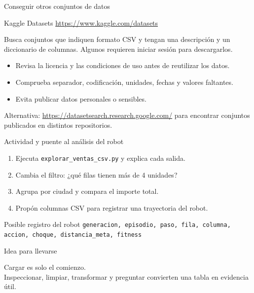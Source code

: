 \documentclass[aspectratio=169,11pt]{beamer}
\begin{document}
\begin{frame}{Conseguir otros conjuntos de datos}
  \begin{block}{Kaggle Datasets}
    \url{https://www.kaggle.com/datasets}
  \end{block}
  Busca conjuntos que indiquen formato CSV y tengan una descripción y un diccionario de columnas. Algunos requieren iniciar sesión para descargarlos.
  \begin{itemize}
    \item Revisa la licencia y las condiciones de uso antes de reutilizar los datos.
    \item Comprueba separador, codificación, unidades, fechas y valores faltantes.
    \item Evita publicar datos personales o sensibles.
  \end{itemize}
  \vspace{0.15cm}
  \small Alternativa: \url{https://datasetsearch.research.google.com/} para encontrar conjuntos publicados en distintos repositorios.
\end{frame}

\begin{frame}{Actividad y puente al análisis del robot}
  \begin{enumerate}
    \item Ejecuta \texttt{explorar\_ventas\_csv.py} y explica cada salida.
    \item Cambia el filtro: ¿qué filas tienen más de 4 unidades?
    \item Agrupa por ciudad y compara el importe total.
    \item Propón columnas CSV para registrar una trayectoria del robot.
  \end{enumerate}
  \begin{block}{Posible registro del robot}
    \texttt{generacion, episodio, paso, fila, columna, accion, choque, distancia\_meta, fitness}
  \end{block}
\end{frame}

\begin{frame}{Idea para llevarse}
  \begin{center}
    \Large Cargar es solo el comienzo.\\[0.3cm]
    \normalsize Inspeccionar, limpiar, transformar y preguntar convierten una tabla en evidencia útil.
  \end{center}
\end{frame}
\end{document}
